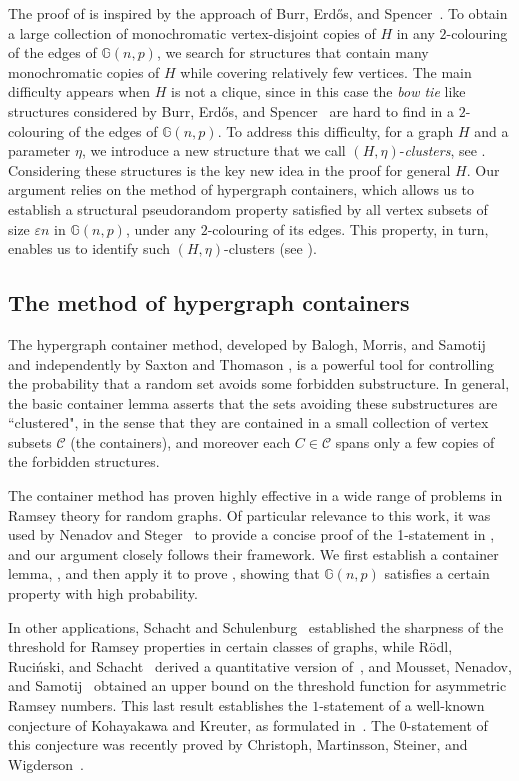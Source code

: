 \documentclass[a4paper,reqno,11pt]{amsart}
\theoremstyle{definition}
\theoremstyle{remark}
\begin{document}
The proof of  is inspired by the approach of Burr, Erd\H{o}s, and Spencer~\cite{BES}. To obtain a large collection of monochromatic vertex-disjoint copies of $H$ in any $2$-colouring of the edges of $\mathbb{G}(n,p)$, we search for structures that contain many monochromatic copies of $H$ while covering relatively few vertices. The main difficulty appears when $H$ is not a clique, since in this case the \textit{bow tie} like structures considered by Burr, Erd\H{o}s, and Spencer~\cite{BES} are hard to find in a $2$-colouring of the edges of $\mathbb{G}(n,p)$. To address this difficulty, for a graph $H$ and a parameter $\eta$, we introduce a new structure that we call $(H, \eta)$-\textit{clusters}, see . Considering these structures is the key new idea in the proof for general $H$. Our argument relies on the method of hypergraph containers, which allows us to establish a structural pseudorandom property satisfied by all vertex subsets of size $\varepsilon n$ in $\mathbb{G}(n,p)$, under any $2$-colouring of its edges. This property, in turn, enables us to identify such $(H, \eta)$-clusters (see ).

\subsection{The method of hypergraph containers} The hypergraph container method, developed by Balogh, Morris, and Samotij \cite{BMS} and independently by Saxton and Thomason \cite{ST}, is a powerful tool for controlling the probability that a random set avoids some forbidden substructure. In general, the basic container lemma asserts that the sets avoiding these substructures are ``clustered", in the sense that they are contained in a small collection of vertex subsets $\mathcal{C}$ (the containers), and moreover each $C\in\mathcal{C}$ spans only a few copies of the forbidden structures.

The container method has proven highly effective in a wide range of problems in Ramsey theory for random graphs. Of particular relevance to this work, it was used by Nenadov and Steger~\cite{NS} to provide a concise proof of the 1-statement in , and our argument closely follows their framework. We first establish a container lemma, , and then apply it to prove , showing that $\mathbb{G}(n,p)$ satisfies a certain property with high probability.

In other applications, Schacht and Schulenburg~\cite{SS} established the sharpness of the threshold for Ramsey properties in certain classes of graphs, while R\"{o}dl, Ruci\'{n}ski, and Schacht~\cite{RRS} derived a quantitative version of~, and Mousset, Nenadov, and Samotij~\cite{MNS} obtained an upper bound on the threshold function for asymmetric Ramsey numbers. This last result establishes the $1$-statement of a well-known conjecture of Kohayakawa and Kreuter, as formulated in~\cite{KSS}. The $0$-statement of this conjecture was recently proved by Christoph, Martinsson, Steiner, and Wigderson~\cite{CMSW}. 
\end{document}
